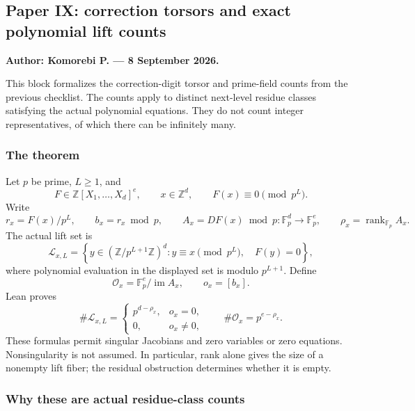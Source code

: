 \hypertarget{cont2:paper-ix-correction-torsors-and-exact-polynomial-lift-counts}{%
\subsection{Paper IX: correction torsors and exact polynomial lift
counts}\label{cont2:paper-ix-correction-torsors-and-exact-polynomial-lift-counts}}

\textbf{Author: Komorebi P. --- 8 September 2026.}

This block formalizes the correction-digit torsor and prime-field counts
from the previous checklist. The counts apply to distinct next-level
residue classes satisfying the actual polynomial equations. They do not
count integer representatives, of which there can be infinitely many.

\hypertarget{cont2:the-theorem}{%
\subsubsection{The theorem}\label{cont2:the-theorem}}

Let \(p\) be prime, \(L\ge1\), and \[
F\in\mathbb Z[X_1,\ldots,X_d]^e,
\qquad x\in\mathbb Z^d,
\qquad F(x)\equiv0\pmod{p^L}.
\] Write \[
r_x=F(x)/p^L,\qquad b_x=r_x\bmod p,
\qquad A_x=DF(x)\bmod p:\mathbb F_p^d\longrightarrow\mathbb F_p^e,
\qquad \rho_x=\operatorname{rank}_{\mathbb F_p}A_x.
\] The actual lift set is \[
\mathcal L_{x,L}=
\left\{y\in(\mathbb Z/p^{L+1}\mathbb Z)^d:
 y\equiv x\pmod{p^L},\quad F(y)=0\right\},
\] where polynomial evaluation in the displayed set is modulo
\(p^{L+1}\). Define \[
\mathcal O_x=\mathbb F_p^e/\operatorname{im}A_x,
\qquad o_x=[b_x].
\] Lean proves \[
\boxed{
\#\mathcal L_{x,L}=
\begin{cases}
p^{d-\rho_x},&o_x=0,\\
0,&o_x\ne0,
\end{cases}
\qquad
\#\mathcal O_x=p^{e-\rho_x}.
}
\] These formulas permit singular Jacobians and zero variables or zero
equations. Nonsingularity is not assumed. In particular, rank alone
gives the size of a nonempty lift fiber; the residual obstruction
determines whether it is empty.

\hypertarget{cont2:why-these-are-actual-residue-class-counts}{%
\subsubsection{Why these are actual residue-class
counts}\label{cont2:why-these-are-actual-residue-class-counts}}

